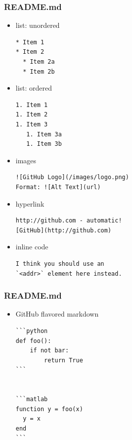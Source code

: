 \documentclass{beamer}
\begin{document}
\begin{frame}[fragile]
\frametitle{README.md}

\begin{itemize}

\item list: unordered
\tiny
\begin{verbatim}
* Item 1
* Item 2
  * Item 2a
  * Item 2b
\end{verbatim}
\normalsize

\item list: ordered
\tiny
\begin{verbatim}
1. Item 1
1. Item 2
1. Item 3
   1. Item 3a
   1. Item 3b
\end{verbatim}
\normalsize


\item images
\tiny
\begin{verbatim}
![GitHub Logo](/images/logo.png)
Format: ![Alt Text](url)
\end{verbatim}
\normalsize

\item hyperlink
\tiny
\begin{verbatim}
http://github.com - automatic!
[GitHub](http://github.com)
\end{verbatim}
\normalsize

\item inline code
\tiny
\begin{verbatim}
I think you should use an
`<addr>` element here instead.
\end{verbatim}
\normalsize

\end{itemize}

\end{frame}










\begin{frame}[fragile]
\frametitle{README.md}

\begin{itemize}

\item GitHub flavored markdown
\tiny
\begin{verbatim}
```python
def foo():
    if not bar:
        return True
```


```matlab
function y = foo(x)
  y = x
end
```
\end{verbatim}
\normalsize


\end{itemize}

\end{frame}
\end{document}
